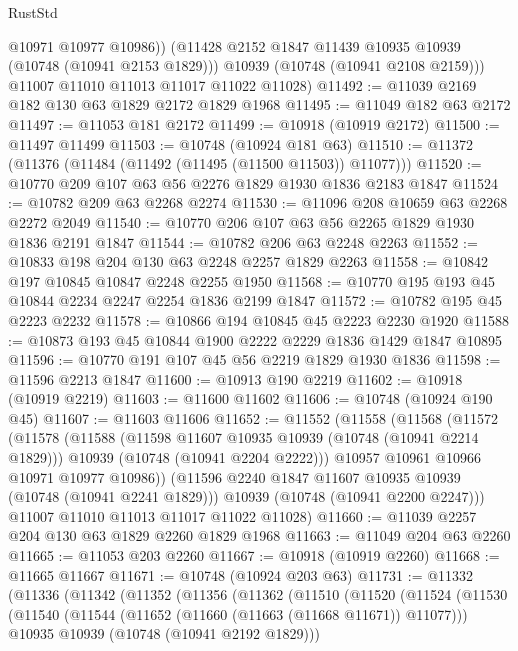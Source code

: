 \begin{lexlean}{RustStd}
\begin{coremodule}
{\begin{coremodule}
{{{{{            @10971
            @10977
            @10986))
        (@11428 @2152 @1847 @11439 @10935 @10939 (@10748 (@10941 @2153 @1829)))
        @10939
        (@10748 (@10941 @2108 @2159)))
      @11007
      @11010
      @11013
      @11017
      @11022
      @11028)
@11492 := @11039 @2169 @182 @130 @63 @1829 @2172 @1829 @1968
@11495 := @11049 @182 @63 @2172
@11497 := @11053 @181 @2172
@11499 := @10918 (@10919 @2172)
@11500 := @11497 @11499
@11503 := @10748 (@10924 @181 @63)
@11510 := @11372 (@11376 (@11484 (@11492 (@11495 (@11500 @11503)) @11077)))
@11520 := @10770 @209 @107 @63 @56 @2276 @1829 @1930 @1836 @2183 @1847
@11524 := @10782 @209 @63 @2268 @2274
@11530 := @11096 @208 @10659 @63 @2268 @2272 @2049
@11540 := @10770 @206 @107 @63 @56 @2265 @1829 @1930 @1836 @2191 @1847
@11544 := @10782 @206 @63 @2248 @2263
@11552 := @10833 @198 @204 @130 @63 @2248 @2257 @1829 @2263
@11558 := @10842 @197 @10845 @10847 @2248 @2255 @1950
@11568 := @10770 @195 @193 @45 @10844 @2234 @2247 @2254 @1836 @2199 @1847
@11572 := @10782 @195 @45 @2223 @2232
@11578 := @10866 @194 @10845 @45 @2223 @2230 @1920
@11588 := @10873 @193 @45 @10844 @1900 @2222 @2229 @1836 @1429 @1847 @10895
@11596 := @10770 @191 @107 @45 @56 @2219 @1829 @1930 @1836
@11598 := @11596 @2213 @1847
@11600 := @10913 @190 @2219
@11602 := @10918 (@10919 @2219)
@11603 := @11600 @11602
@11606 := @10748 (@10924 @190 @45)
@11607 := @11603 @11606
@11652 := @11552
    (@11558
      (@11568
        (@11572
          (@11578
            (@11588
              (@11598 @11607 @10935 @10939 (@10748 (@10941 @2214 @1829)))
              @10939
              (@10748 (@10941 @2204 @2222)))
            @10957
            @10961
            @10966
            @10971
            @10977
            @10986))
        (@11596 @2240 @1847 @11607 @10935 @10939 (@10748 (@10941 @2241 @1829)))
        @10939
        (@10748 (@10941 @2200 @2247)))
      @11007
      @11010
      @11013
      @11017
      @11022
      @11028)
@11660 := @11039 @2257 @204 @130 @63 @1829 @2260 @1829 @1968
@11663 := @11049 @204 @63 @2260
@11665 := @11053 @203 @2260
@11667 := @10918 (@10919 @2260)
@11668 := @11665 @11667
@11671 := @10748 (@10924 @203 @63)
@11731 := @11332
    (@11336
      (@11342
        (@11352
          (@11356
            (@11362
              (@11510
                (@11520
                  (@11524
                    (@11530
                      (@11540
                        (@11544 (@11652 (@11660 (@11663 (@11668 @11671)) @11077)))
                        @10935
                        @10939
                        (@10748 (@10941 @2192 @1829)))
}}}}}
\end{coremodule}}
\end{coremodule}
\end{lexlean}
